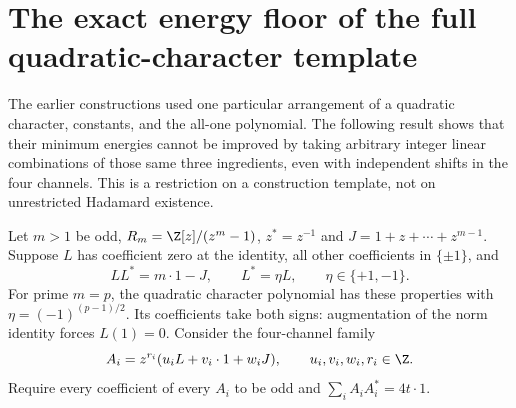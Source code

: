 \section{The exact energy floor of the full quadratic-character template}
The earlier constructions used one particular arrangement of a quadratic
character, constants, and the all-one polynomial. The following result
shows that their minimum energies cannot be improved by taking arbitrary
integer linear combinations of those same three ingredients, even with
independent shifts in the four channels. This is a restriction on a
construction template, not on unrestricted Hadamard existence.

Let $m>1$ be odd, $R_m=\Z[z]/(z^m-1)$, $z^*=z^{-1}$ and
$J=1+z+\cdots+z^{m-1}$. Suppose $L$ has coefficient zero at the
identity, all other coefficients in $\{\pm1\}$, and
\[
 LL^*=m\cdot1-J,\qquad L^*=\eta L,\qquad \eta\in\{+1,-1\}.
\]
For prime $m=p$, the quadratic character polynomial has these
properties with $\eta=(-1)^{(p-1)/2}$. Its coefficients take both signs:
augmentation of the norm identity forces $L(1)=0$.
Consider the four-channel family
\begin{equation}\label{s03:eq:fullspan}
 A_i=z^{r_i}(u_iL+v_i\cdot1+w_iJ),\qquad
 u_i,v_i,w_i,r_i\in\Z.
\end{equation}
Require every coefficient of every $A_i$ to be odd and
$\sum_iA_iA_i^*=4t\cdot1$.

